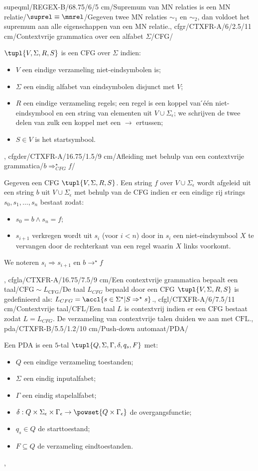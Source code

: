 supeqml/REGEX-B/68.75/6/5 cm/Supremum van MN relaties is een MN relatie/$\suprel\equiv\mnrel$/{Gegeven twee MN relaties $\sim_1$ en $\sim_2$, dan voldoet het supremum aan alle eigenschappen van een MN relatie.},
cfgr/CTXFR-A/6/2.5/11 cm/Contextvrije grammatica over een alfabet $\Sigma$/CFG/{$\tupl{V,\Sigma,R,S}$ is een CFG over $\Sigma$ indien:\begin{itemize}\item $V$ een eindige verzameling niet-eindsymbolen is; \item $\Sigma$ een eindig alfabet van eindsymbolen disjunct met $V$; \item $R$ een eindige verzameling regels; een regel is een koppel van  ́\'e\'en niet-eindsymbool en een string van elementen uit $V\cup\Sigma_{\epsilon}$; we schrijven de twee delen van zulk een koppel met een $\rightarrow$ ertussen;\item $S\in V$ is het startsymbool.\end{itemize}},
cfgder/CTXFR-A/16.75/1.5/9 cm/Afleiding met behulp van een contextvrije grammatica/$b\Rightarrow_{CFG}^{\star}f$/{Gegeven een CFG $\tupl{V,\Sigma,R,S}$. Een string $f$ over $V\cup\Sigma_{\epsilon}$ wordt afgeleid uit een string $b$ uit $V\cup\Sigma_{\epsilon}$ met behulp van de CFG indien er een eindige rij strings $s_0,s_1,\ldots,s_n$ bestaat zodat:\begin{itemize}\item $s_0=b\wedge s_n=f$; \item $s_{i+1}$ verkregen wordt uit $s_i$ (voor $i<n$) door in $s_i$ een niet-eindsymbool $X$ te vervangen door de rechterkant van een regel waarin $X$ links voorkomt.\end{itemize}We noteren $s_i\Rightarrow s_{i+1}$ en $b\rightarrow^{\star}f$},
cfgla/CTXFR-A/16.75/7.5/9 cm/Een contextvrije grammatica bepaalt een taal/$\mbox{CFG}\sim L_{\mbox{CFG}}$/{De taal $L_{CFG}$ bepaald door een CFG $\tupl{V,\Sigma,R,S}$ is gedefinieerd als: $L_{CFG}=\accl{s\in\Sigma^{\star}|S\Rightarrow^{\star}s}$.},
cfgl/CTXFR-A/6/7.5/11 cm/Contextvrije taal/$\mbox{CFL}$/{Een taal $L$ is contextvrij indien er een CFG bestaat zodat $L=L_{CFG}$. De verzameling van contextvrije talen duiden we aan met $\mbox{CFL}$.},
pda/CTXFR-B/5.5/1.2/10 cm/Push-down automaat/PDA/{Een PDA is een $5$-tal $\tupl{Q,\Sigma,\Gamma,\delta,q_s,F}$ met:\begin{itemize}\item $Q$ een eindige verzameling toestanden;\item $\Sigma$ een eindig inputalfabet;\item $\Gamma$ een eindig stapelalfabet;\item $\delta:Q\times\Sigma_{\epsilon}\times\Gamma_{\epsilon}\rightarrow\powset{Q\times\Gamma_{\epsilon}}$ de overgangsfunctie;\item $q_s\in Q$ de starttoestand;\item $F\subseteq Q$ de verzameling eindtoestanden.\end{itemize}},
